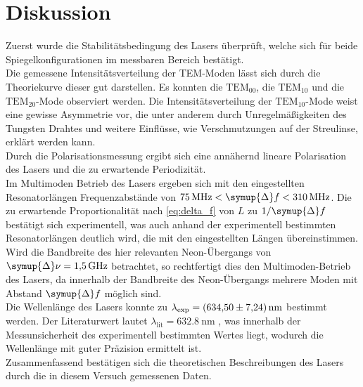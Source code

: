 \section{Diskussion}
\label{sec:Diskussion}
Zuerst wurde die Stabilitätsbedingung des Lasers überprüft, welche sich für beide Spiegelkonfigurationen im messbaren Bereich bestätigt. \\
Die gemessene Intensitätsverteilung der TEM-Moden lässt sich durch die Theoriekurve dieser gut darstellen. Es konnten die $\text{TEM}_{00}$,
die $\text{TEM}_{10}$ und die $\text{TEM}_{20}$-Mode observiert werden. Die Intensitätsverteilung der $\text{TEM}_{10}$-Mode weist eine gewisse Asymmetrie vor,
die unter anderem durch Unregelmäßigkeiten des Tungsten Drahtes und weitere Einflüsse, wie Verschmutzungen auf der Streulinse, erklärt werden kann. \\
Durch die Polarisationsmessung ergibt sich eine annähernd lineare Polarisation des Lasers und die zu erwartende Periodizität. \\
Im Multimoden Betrieb des Lasers ergeben sich mit den eingestellten Resonatorlängen Frequenzabstände von $\qty{75}{\mega\hertz} < \symup{\Delta}f < \qty{310}{\mega\hertz}$.
Die zu erwartende Proportionalität nach \autoref{eq:delta_f} von $L$ zu $1/\symup{\Delta}f$ bestätigt sich experimentell, was auch anhand der experimentell bestimmten Resonatorlängen
deutlich wird, die mit den eingestellten Längen übereinstimmen.
Wird die Bandbreite des hier relevanten Neon-Übergangs von 
$\symup{\Delta}\nu = \qty{1.5}{\giga\hertz}$ \cite{HeNe_Wiki} betrachtet, so rechtfertigt dies den Multimoden-Betrieb des Lasers, da innerhalb der Bandbreite des Neon-Übergangs 
mehrere Moden mit Abstand $\symup{\Delta}f$ möglich sind. \\
Die Wellenlänge des Lasers konnte zu $\lambda_\text{exp} = \qty{634.5 +- 7.24}{\nano\metre}$ bestimmt werden. Der Literaturwert lautet 
$\lambda_\text{lit} =  \qty{632.8}{\nano\metre}$ \cite{HeNe_Wiki}, was innerhalb der Messunsicherheit des experimentell bestimmten Wertes liegt, wodurch 
die Wellenlänge mit guter Präzision ermittelt ist. \\
Zusammenfassend bestätigen sich die theoretischen Beschreibungen des Lasers durch die in diesem Versuch gemessenen Daten.
